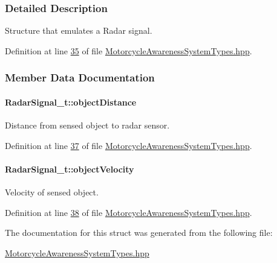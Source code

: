 \subsubsection{Detailed Description}
Structure that emulates a Radar signal. 

Definition at line \hyperlink{MotorcycleAwarenessSystemTypes_8hpp_source_l00035}{35} of file \hyperlink{MotorcycleAwarenessSystemTypes_8hpp_source}{Motorcycle\-Awareness\-System\-Types.\-hpp}.



\subsubsection{Member Data Documentation}
\hypertarget{structRadarSignal__t_a96938fbfb77f208743a36d3f8b37cccb}{
\paragraph[{object\-Distance}]{ Radar\-Signal\-\_\-t\-::object\-Distance}}\label{structRadarSignal__t_a96938fbfb77f208743a36d3f8b37cccb}


Distance from sensed object to radar sensor. 



Definition at line \hyperlink{MotorcycleAwarenessSystemTypes_8hpp_source_l00037}{37} of file \hyperlink{MotorcycleAwarenessSystemTypes_8hpp_source}{Motorcycle\-Awareness\-System\-Types.\-hpp}.

\hypertarget{structRadarSignal__t_a0bbaf402c80288a0819dbbfaded8a44a}{
\paragraph[{object\-Velocity}]{ Radar\-Signal\-\_\-t\-::object\-Velocity}}\label{structRadarSignal__t_a0bbaf402c80288a0819dbbfaded8a44a}


Velocity of sensed object. 



Definition at line \hyperlink{MotorcycleAwarenessSystemTypes_8hpp_source_l00038}{38} of file \hyperlink{MotorcycleAwarenessSystemTypes_8hpp_source}{Motorcycle\-Awareness\-System\-Types.\-hpp}.



The documentation for this struct was generated from the following file\-:\begin{DoxyCompactItemize}
\item 
\hyperlink{MotorcycleAwarenessSystemTypes_8hpp}{Motorcycle\-Awareness\-System\-Types.\-hpp}\end{DoxyCompactItemize}
